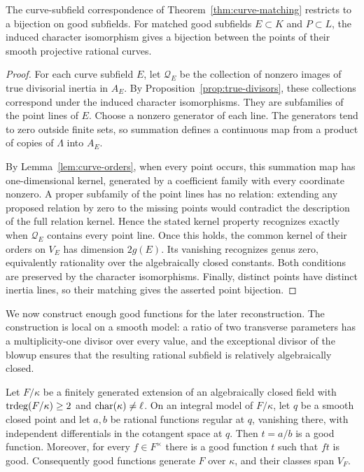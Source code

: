 \begin{proposition}
\label{prop:good-matching}
The curve-subfield correspondence of Theorem~\ref{thm:curve-matching}
restricts to a bijection on good subfields.  For matched good subfields
$E\subset K$ and $P\subset L$, the induced character isomorphism gives
a bijection between the points of their smooth projective rational curves.
\end{proposition}

\begin{proof}
For each curve subfield $E$, let $\mathcal Q_E$ be the collection of
nonzero images of true divisorial inertia in $A_E$.  By
Proposition~\ref{prop:true-divisors}, these collections correspond under
the induced character isomorphisms.  They are subfamilies of the point
lines of $E$.  Choose a nonzero generator of each line.  The generators
tend to zero outside finite sets, so summation defines a continuous map
from a product of copies of $\Lambda$ into $A_E$.

By Lemma~\ref{lem:curve-orders}, when every point occurs, this summation
map has one-dimensional kernel, generated by a coefficient family with
every coordinate nonzero.  A proper subfamily of the point lines has no
relation: extending any proposed relation by zero to the missing points
would contradict the description of the full relation kernel.  Hence
the stated kernel property recognizes exactly when $\mathcal Q_E$
contains every point line.  Once this holds, the common kernel of their
orders on $V_E$ has dimension $2g(E)$.  Its vanishing recognizes genus
zero, equivalently rationality over the algebraically closed constants.
Both conditions are preserved by the character isomorphisms.  Finally,
distinct points have distinct inertia lines, so their matching gives the
asserted point bijection.
\end{proof}

We now construct enough good functions for the later reconstruction.
The construction is local on a smooth model: a ratio of two transverse
parameters has a multiplicity-one divisor over every value, and the
exceptional divisor of the blowup ensures that the resulting rational
subfield is relatively algebraically closed.

\begin{lemma}
\label{lem:good-functions}
Let $F/\kappa$ be a finitely generated extension of an algebraically
closed field with $\operatorname{trdeg}(F/\kappa)\ge2$ and
$\operatorname{char}(\kappa)\ne\ell$.  On an integral model of $F/\kappa$, let
$q$ be a smooth closed point and let $a,b$ be rational functions regular
at $q$, vanishing there, with independent differentials in the cotangent
space at $q$.  Then $t=a/b$ is a good function.  Moreover, for every
$f\in F^\times$ there is a good function $t$ such that $ft$ is good.
Consequently good functions generate $F$ over $\kappa$, and their classes
span $V_F$.
\end{lemma}

